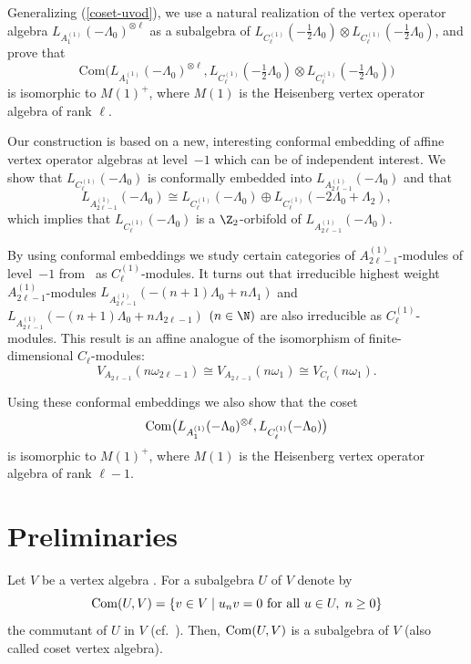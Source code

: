\documentclass[pdftex]{sigma}
\begin{document}
Generalizing (\ref{coset-uvod}), we use a natural realization of the
vertex operator algebra $L_{A_1 ^{(1)}}(- \Lambda_0) ^{\otimes
\ell}$ as a subalgebra of $L_{C_{\ell}
^{(1)}}(-\tfrac{1}{2}\Lambda_0) \otimes L_{C_{\ell}
^{(1)}}(-\tfrac{1}{2}\Lambda_0)$, and prove that
\[ \mbox{Com} \big(L_{A_1 ^{(1)}}(- \Lambda_0) ^{\otimes \ell},
L_{C_{\ell} ^{(1)}}(-\tfrac{1}{2}\Lambda_0) \otimes L_{C_{\ell}
^{(1)}}(-\tfrac{1}{2}\Lambda_0)\big) \]
is isomorphic to $M(1) ^+$, where $M(1)$ is the Heisenberg vertex
operator algebra of rank $\ell$.

Our construction is based on a new, interesting conformal  embedding
of af\/f\/ine vertex ope\-ra\-tor algebras at level~$-1$ which can be of
independent interest. We show that $L_{C_{\ell} ^{(1)}}(-\Lambda_0)$
is conformally embedded into $L_{A_{2 \ell -1} ^{(1)}} (-\Lambda_0)$
and that \[ L_{A_{2 \ell -1} ^{(1)}} (-\Lambda_0) \cong  L
_{C_{\ell} ^{(1)}} (-\Lambda_0) \oplus  L _{C_{\ell} ^{(1)}}
(-2\Lambda_0 + \Lambda_2),\]
%
which implies that $L _{C_{\ell} ^{(1)}} (-\Lambda_0)$ is a $\Z
_2$-orbifold of $L_{A_{2 \ell -1} ^{(1)}} (-\Lambda_0)$.

{\sloppy By using conformal embeddings we study certain categories of
$A_{2\ell-1} ^{(1)}$-modules of level~$-1$  from~\cite{AP} as
$C_{\ell} ^{(1)}$-modules. It turns out that  irreducible highest
weight $A_{2\ell-1} ^{(1)}$-modules $L_{ A_{2\ell -1} ^{(1)} } (-
(n+1) \Lambda_0 + n \Lambda_{1} )$ and $L_{ A_{2\ell -1} ^{(1)} } (-
(n+1) \Lambda_0 + n \Lambda_{2 \ell -1} )$ $(n \in {\N} )$ are also
irreducible as $C_{\ell} ^{(1)}$-modules. This result is an af\/f\/ine
analogue of the isomorphism of f\/inite-dimensional $
C_{\ell}$-modules:
\[ V_{A_{2\ell -1} } (n \omega_{2 \ell -1}) \cong V_{A_{2\ell -1} } (n
\omega_1) \cong V_{C_{ \ell  } } (n \omega_1).
\]

}


Using these conformal embeddings  we also  show that the coset
\[ {\rm Com} \big(   L _{A_1 ^{(1)}} (-\Lambda_0) ^{\otimes \ell}
,L_{C_{\ell} ^{(1)}} (-\Lambda_0) \big) \]
is isomorphic to $M(1) ^+$, where $M(1)$ is the Heisenberg vertex
operator algebra of rank $\ell -1$.



\section{Preliminaries}

Let $V$ be a vertex algebra \cite{B, FHL, FLM,LL}. For a subalgebra $U$ of $V$ denote by
\[
{\rm Com}(U,V)= \{ v \in V \; | \; u_n v =0 \mbox{ for all } u \in U,\;
n \geq 0 \} \]
%
 the commutant of $U$ in $V$ (cf.~\cite{FZ, GKO,LL}). Then, ${\rm Com}(U,V)$ is a
subalgebra of $V$ (also called coset vertex algebra).
\end{document}
